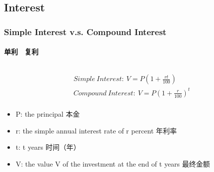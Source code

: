 \documentclass[
	11pt, %
]{beamer}
\begin{document}

\subsection{Interest}

\begin{frame}
	\frametitle{Simple Interest v.s. Compound Interest}
	\framesubtitle{单利 \ 复利 }

	\begin{columns}[t] 
		\begin{column}{0.5\textwidth} %
			\begin{equation*}
			  \begin{aligned}
			  	&Simple\ Interest:\	V =P(1 + \frac{rt}{100})\\
			  	&Compound\ Interest:\	V =P(1 + \frac{r}{100})^t\\
			  \end{aligned}
			\end{equation*}
			\begin{itemize}
				\item P: the principal 本金 
			  \item		r:  the simple annual interest rate of r  percent  年利率
			  \item		t:  t years  时间（年）
			  \item		V:  the value V of the investment at the end of t years  最终金额
			\end{itemize}
		\end{column}


\end{columns}
\end{frame}
\end{document}
